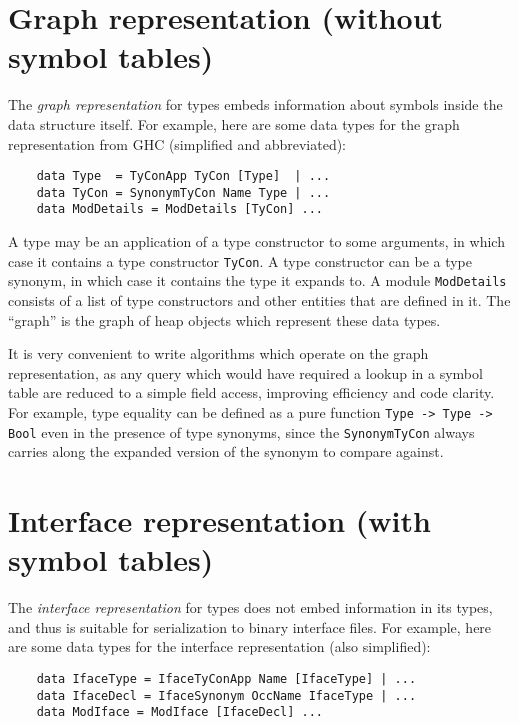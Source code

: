 \section{Graph representation (without symbol tables)}
\label{sec:graph}

The \emph{graph representation} for types embeds information about
symbols inside the data structure itself.  For example, here are
some data types for the graph representation from GHC (simplified
and abbreviated):

\begin{verbatim}
    data Type  = TyConApp TyCon [Type]  | ...
    data TyCon = SynonymTyCon Name Type | ...
    data ModDetails = ModDetails [TyCon] ...
\end{verbatim}

\noindent
A type may be an application of a type constructor to some arguments, in which
case it contains a type constructor \verb|TyCon|.  A type constructor
can be a type synonym, in which case it contains the type it expands
to.  A module \verb|ModDetails| consists of a list of type constructors
and other entities that are defined in it.  The ``graph'' is the graph of
heap objects which represent these data types.

It is very convenient to write algorithms which operate on the graph
representation, as any query which would have required a lookup in
a symbol table are reduced to a simple field access, improving efficiency
and code clarity.  For example, type equality can be defined as a
pure function \verb|Type -> Type -> Bool| even in the presence of type
synonyms, since the \verb|SynonymTyCon| always carries along the expanded
version of the synonym to compare against.

\section{Interface representation (with symbol tables)}
\label{sec:interface}

The \emph{interface representation} for types does not
embed information in its types, and thus is suitable
for serialization to binary interface files.  For example,
here are some data types for the interface representation
(also simplified):

\begin{verbatim}
    data IfaceType = IfaceTyConApp Name [IfaceType] | ...
    data IfaceDecl = IfaceSynonym OccName IfaceType | ...
    data ModIface = ModIface [IfaceDecl] ...
\end{verbatim}

